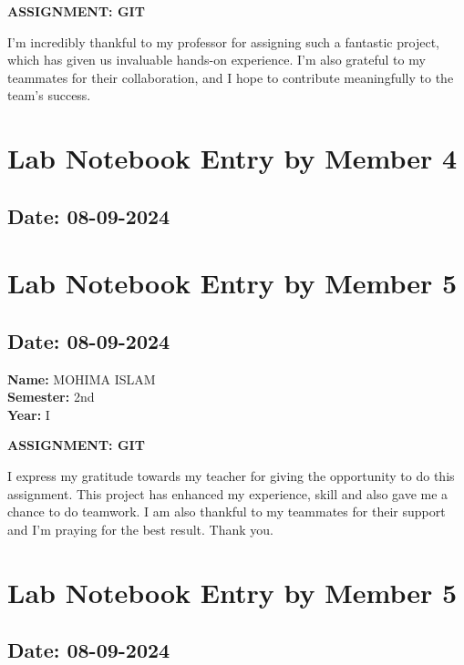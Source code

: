 \documentclass[12pt]{article}
\begin{document}
\begin{center}
\Huge \textbf{ASSIGNMENT: GIT}
\end{center}

I'm incredibly thankful to my professor for assigning such a fantastic project, which has given us invaluable hands-on experience. I'm also grateful to my teammates for their collaboration, and I hope to contribute meaningfully to the team's success.

\newpage
\section{Lab Notebook Entry by Member 4}
\subsection*{Date: 08-09-2024}
\newpage


\section{Lab Notebook Entry by Member 5}
\subsection*{Date: 08-09-2024}

\begin{flushright}
\textbf{Name:} MOHIMA ISLAM \\
\textbf{Semester:} 2nd \\
\textbf{Year:} I \\
\end{flushright}

\begin{center}
\Huge \textbf{ASSIGNMENT: GIT}
\end{center}

I express my gratitude towards my teacher for giving the opportunity to do this assignment. This project has enhanced my experience, skill and also gave me a chance to do teamwork. I am also thankful to my teammates for their support and I'm praying for the best result. Thank you.
\newpage
\section{Lab Notebook Entry by Member 5}
\subsection*{Date: 08-09-2024}
\end{document}

